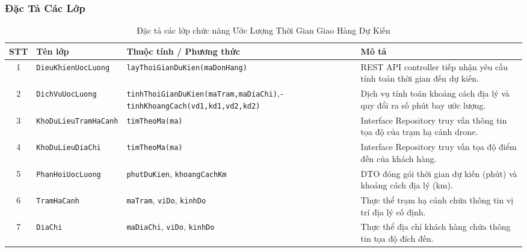 \subsubsection{Đặc Tả Các Lớp}
\begin{table}[H]
  \centering
  \small
  \begin{tabularx}{\textwidth}{|c|>{\raggedright\arraybackslash}p{3.5cm}|>{\raggedright\arraybackslash}p{4.5cm}|>{\raggedright\arraybackslash}X|}
    \hline
    \textbf{STT} & \textbf{Tên lớp} & \textbf{Thuộc tính / Phương thức} & \textbf{Mô tả} \\
    \hline
    1 & \texttt{Dieu\allowbreak Khien\allowbreak Uoc\allowbreak Luong} & \texttt{lay\allowbreak Thoi\allowbreak Gian\allowbreak Du\allowbreak Kien\allowbreak (ma\allowbreak Don\allowbreak Hang)} & REST API controller tiếp nhận yêu cầu tính toán thời gian đến dự kiến. \\ \hline
    2 & \texttt{Dich\allowbreak Vu\allowbreak Uoc\allowbreak Luong} & \texttt{tinh\allowbreak Thoi\allowbreak Gian\allowbreak Du\allowbreak Kien\allowbreak (ma\allowbreak Tram,\allowbreak ma\allowbreak Dia\allowbreak Chi)},\newline \texttt{- tinh\allowbreak Khoang\allowbreak Cach\allowbreak (vd1,\allowbreak kd1,\allowbreak vd2,\allowbreak kd2)} & Dịch vụ tính toán khoảng cách địa lý và quy đổi ra số phút bay ước lượng. \\ \hline
    3 & \texttt{Kho\allowbreak Du\allowbreak Lieu\allowbreak Tram\allowbreak Ha\allowbreak Canh} & \texttt{tim\allowbreak Theo\allowbreak Ma\allowbreak (ma)} & Interface Repository truy vấn thông tin tọa độ của trạm hạ cánh drone. \\ \hline
    4 & \texttt{Kho\allowbreak Du\allowbreak Lieu\allowbreak Dia\allowbreak Chi} & \texttt{tim\allowbreak Theo\allowbreak Ma\allowbreak (ma)} & Interface Repository truy vấn tọa độ điểm đến của khách hàng. \\ \hline
    5 & \texttt{Phan\allowbreak Hoi\allowbreak Uoc\allowbreak Luong} & \texttt{phut\allowbreak Du\allowbreak Kien}, \texttt{khoang\allowbreak Cach\allowbreak Km} & DTO đóng gói thời gian dự kiến (phút) và khoảng cách địa lý (km). \\ \hline
    6 & \texttt{Tram\allowbreak Ha\allowbreak Canh} & \texttt{ma\allowbreak Tram}, \texttt{vi\allowbreak Do}, \texttt{kinh\allowbreak Do} & Thực thể trạm hạ cánh chứa thông tin vị trí địa lý cố định. \\ \hline
    7 & \texttt{Dia\allowbreak Chi} & \texttt{ma\allowbreak Dia\allowbreak Chi}, \texttt{vi\allowbreak Do}, \texttt{kinh\allowbreak Do} & Thực thể địa chỉ khách hàng chứa thông tin tọa độ đích đến. \\
    \hline
  \end{tabularx}
  \caption{Đặc tả các lớp chức năng Ước Lượng Thời Gian Giao Hàng Dự Kiến}
  \label{tab:class-spec-uc10}
\end{table}

